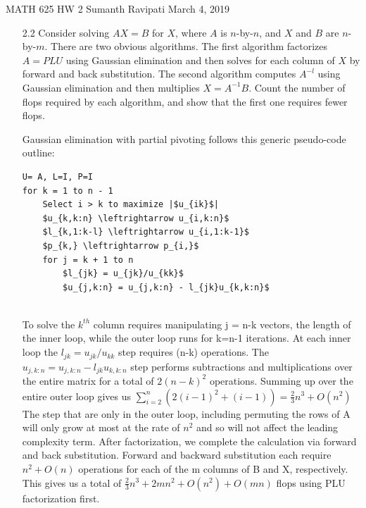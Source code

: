 \documentclass[12pt,letterpaper,reqno]{amsart}
\begin{document}
\thispagestyle{empty}
\begin{center}\large{
    MATH 625\quad
    HW 2\quad
    Sumanth Ravipati\quad
    March 4, 2019}
\end{center}
\vspace{.25in}

\begin{enumerate}
\item[2.2] Consider solving $AX = B$ for $X$, where $A$ is $n$-by-$n$, and $X$ and $B$ are $n$-by-$m$. There are two obvious algorithms. The first algorithm factorizes $A  = PLU$ using Gaussian elimination and then solves for each column of $X$ by forward and back substitution. The second algorithm computes $A^{-l}$ using Gaussian elimination and then multiplies $X = A^{-1} B$. Count the number of flops required by each algorithm, and show that the first one requires fewer flops.
\newline
\begin{flushleft}
Gaussian elimination with partial pivoting follows this generic pseudo-code outline: \newline
\end{flushleft}
\begin{lstlisting}[mathescape=true]
U= A, L=I, P=I
for k = 1 to n - 1
    Select i > k to maximize |$u_{ik}$|
    $u_{k,k:n} \leftrightarrow u_{i,k:n}$
    $l_{k,1:k-l} \leftrightarrow u_{i,1:k-1}$
    $p_{k,} \leftrightarrow p_{i,}$
    for j = k + 1 to n
        $l_{jk} = u_{jk}/u_{kk}$
        $u_{j,k:n} = u_{j,k:n} - l_{jk}u_{k,k:n}$
        
\end{lstlisting}
\vspace{.15in}
\begin{flushleft}
To solve the $k^{th}$ column requires manipulating j = n-k vectors, the length of the inner loop, while the outer loop runs for k=n-1 iterations. At each inner loop the $l_{jk} = u_{jk}/u_{kk}$ step requires (n-k) operations. The $u_{j,k:n} = u_{j,k:n} - l_{jk}u_{k,k:n}$ step performs subtractions and multiplications over the entire matrix for a total of $2(n-k)^2$ operations. Summing up over the entire outer loop gives us $\sum_{i=2}^{n}\left(2(i-1)^{2}+(i-1)\right)=\frac{2}{3} n^{3}+O\left(n^{2}\right)$ The step that are only in the outer loop, including permuting the rows of A will only grow at most at the rate of $n^2$ and so will not affect the leading complexity term. After factorization, we complete the calculation via forward and back substitution. Forward and backward substitution each require $n^2 + O(n)$ operations for each of the m columns of B and X, respectively. This gives us a total of $\frac{2}{3}n^3 + 2mn^2 + O(n^2) + O(mn)$ flops using PLU factorization first.
\newline


\end{flushleft}
\end{enumerate}
\end{document}
